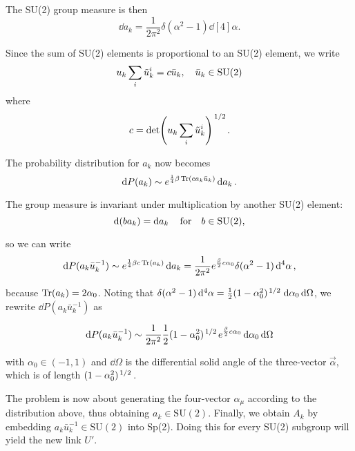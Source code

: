 \documentclass[reqno,12pt]{article}
\numberwithin{equation}{section}
\newcommand{\SU}{\mathrm{SU}}
\begin{document}
The SU(2) group measure is then
\begin{equation}
	\dd{a_k} = \frac{1}{2\pi^2} \delta(\alpha^2 - 1) \dd[4]{\alpha}.
\end{equation}

Since the sum of SU(2) elements is proportional to an SU(2) element, we write
\begin{equation}
	u_k \sum_i \tilde{u}_k^i = c \bar{u}_k \qc \bar{u}_k \in \SU(2)
\end{equation}
where 
\begin{equation}
	c = \det(u_k \sum_i \tilde{u}_k^i)^{\flatfrac{1}{2}}.
\end{equation}

The probability distribution for $a_k$ now becomes
\begin{equation}
	\dd{P(a_k)} \sim e^{\frac{1}{4}\beta\Tr(c a_k \bar{u}_k)} \dd{a_k}.
\end{equation}

The group measure is invariant under multiplication by another SU(2) element:
\begin{equation}
	\dd(b a_k) = \dd{a_k} \qfor b \in \SU(2),
\end{equation}

so we can write
\begin{equation}
	\dd{P(a_k \bar{u}_k^{-1})} \sim e^{\frac{1}{4}\beta c \Tr(a_k)} \dd{a_k} 
	= \frac{1}{2\pi^2} e^{\frac{\beta}{2}c \alpha_0} \delta(\alpha^2 - 1) \dd[4]{\alpha},
\end{equation}

because $\Tr(a_k) = 2\alpha_0$. Noting that $\delta(\alpha^2 - 1)\dd[4]{\alpha} = 
\frac{1}{2}(1 - \alpha_0^2)^{\flatfrac{1}{2}} \dd{\alpha_0}\dd{\Omega}$, we rewrite $\dd{P(a_k \bar{u}_k^{-1})}$ as

\begin{equation}
	\dd{P(a_k \bar{u}_k^{-1})} \sim 
	\frac{1}{2\pi^2} \frac{1}{2}(1 - \alpha_0^2)^{\flatfrac{1}{2}} e^{\frac{\beta}{2}c \alpha_0} \dd{\alpha_0}\dd{\Omega}
\end{equation}

with $\alpha_0 \in (-1,1)$ and $\dd{\Omega}$ is the differential solid angle of the three-vector $\vec{\alpha}$,
which is of length $(1 - \alpha_0^2)^{\flatfrac{1}{2}}$.

The problem is now about generating the four-vector $\alpha_\mu$ according to the distribution above, thus obtaining
$a_k \in \SU(2)$. Finally, we obtain $A_k$ by embedding $a_k \bar{u}_k^{-1} \in \SU(2)$ into Sp(2). Doing this for every 
SU(2) subgroup will yield the new link $U'$.
\end{document}
